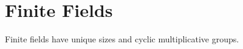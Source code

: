\section{Finite Fields}
\label{sec:finite-fields}

Finite fields have unique sizes and cyclic multiplicative groups.

